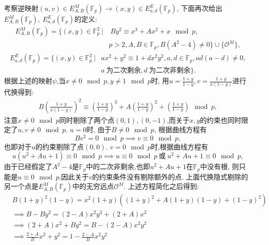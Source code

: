 \documentclass{article}
\newcommand{\F}{\mathbb{F}}
\begin{document}
考察逆映射$(u,v) \in E_{A,B}^M(\F_p) \rightarrow  (x,y) \in E_{a,d}^E(\F_p)$,
下面再次给出$E_{A,B}^M(\F_p),\ E_{a,d}^E(\F_p)$的定义:
\begin{equation*}
\begin{split}
E_{A,B}^M(\F_p) = \{(x,y)\in\F_p^2\  | &\  B y^2 \equiv x^3 + A x^2 + x\mod p, \\
& p >2, A, B \in \F_p, B(A^2-4)\neq 0 \} \cup \{\mathcal{O}^M\},
\end{split}
\end{equation*}
\begin{equation*}
\begin{array}{rl}
E_{a,d}^E(\F_p) = \{(x,y)\in\F_p^2 \ | & ax^2 + y^2 \equiv 1 + dx^2y^2, a, d \in \F_p, ad(a-d)\neq 0,\\
& a\ \text{为二次剩余}, d\ \text{为二次非剩余} \}.
\end{array}
\end{equation*}
根据上述的映射$\psi$,当$x\neq 0 \mod p, y \neq 1 \mod p$时,
用$u = \frac{1+y}{1-y}, v =  \frac{1+y}{x(1-y)}$进行代换得到:
\begin{equation*}
\begin{array}{rl}
B\left(\frac{1+y}{x(1-y)}\right)^2 \equiv \left( \frac{1+y}{1-y}\right)^3 + A \left( \frac{1+y}{1-y}\right)^2 + \left( \frac{1+y}{1-y}\right) \mod p,
\end{array}
\end{equation*}
注意$x\neq 0 \mod p$同时剔除了两个点$(0,1), (0,-1)$,而关于$x,y$的约束也同时限定了$u,v\neq0\mod p$.
$u=0$时, 由于$B\neq 0\mod p$, 根据曲线方程有
$$Bv^2 = 0\mod p \implies v \equiv 0\mod p,$$
也即对于$u$的约束剔除了点$(0,0)$. $v = 0 \mod p$时,根据曲线方程有
$$u(u^2 + Au + 1) \equiv 0 \mod p \implies u \equiv 0 \mod p\ \text{或}\ u^2 + Au + 1 \equiv 0 \mod p,$$
由于已经假定了$A^2-4$是$\F_p$中的二次非剩余,也即$u^2  + Au + 1$在$\F_p$中没有根,
则只能是$u \equiv 0 \mod p$.因此关于$v$的约束条件没有剔除额外的点.
上面代换隐式剔除的另一个点是$E_{A,B}^M(\F_p)$中的无穷远点$\mathcal{O}^M$.
上述方程简化之后得到:
\begin{equation*}
\begin{array}{cc}
& B(1+y)^2(1-y) = x^2(1+y)\left( (1+y)^2 + A(1+y)(1-y) + (1-y)^2  \right) \\
& \implies B-By^2 =  (2-A)x^2y^2 + (2+A)x^2 \\
& \implies (2+A)x^2 + By^2 = B - (2-A)x^2y^2\\
& \implies \frac{2+A}{B}x^2 + y^2 = 1 - \frac{2-A}{B}x^2y^2
\end{array}
\end{equation*}
\end{document}
